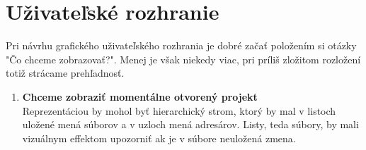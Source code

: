 \section{Uživateľské rozhranie}

Pri návrhu grafického uživateľského rozhrania je dobré začať položením si otázky "Čo chceme zobrazovať?". Menej je však niekedy viac, pri príliš zložitom rozložení totiž strácame prehľadnosť. \\

\begin{enumerate}
	\item \textbf{Chceme zobraziť momentálne otvorený projekt} \\
	Reprezentáciou by mohol byť hierarchický strom, ktorý by mal v listoch uložené mená súborov a v uzloch mená adresárov. Listy, teda súbory, by mali vizuálnym effektom upozorniť ak je v súbore neuložená zmena. \\
	

\end{enumerate}
